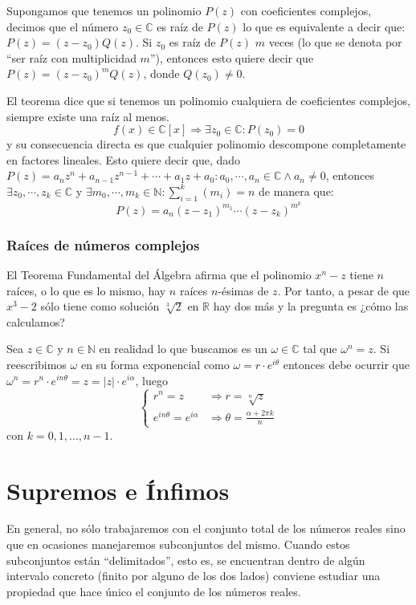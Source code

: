 \documentclass[10pt,a4paper,openright]{book}
\theoremstyle{break}
\begin{document}
Supongamos que tenemos un polinomio $P(z)$ con coeficientes complejos, decimos que el número $z_0\in \mathbb C$ es raíz de $P(z)$ lo que es equivalente a decir que: $P(z)=(z-z_0)Q(z)$. Si $z_0$ es raíz de $P(z)$ $m$ veces (lo que se denota por ``ser raíz con multiplicidad $m$''), entonces esto quiere decir que $P(z)=(z-z_0)^mQ(z)$, donde $Q(z_0)\neq 0$.

El teorema dice que si tenemos un polinomio cualquiera de coeficientes complejos, siempre existe una raíz al menos.
$$f(x)\in \mathbb C[x]\Rightarrow \exists z_0\in \mathbb C: P(z_0)=0$$
y su consecuencia directa es que cualquier polinomio descompone completamente en factores lineales. Esto quiere decir que, dado $P(z)=a_nz^n+a_{n-1}z^{n-1}+\cdots + a_1z+a_0: a_0,\cdots, a_n\in \mathbb C \wedge a_n\neq 0$, entonces $\exists z_0,\cdots, z_k\in \mathbb C$ y $\exists m_0,\cdots, m_k\in \mathbb N : \sum_{i=1}^k(m_i)=n$ de manera que:
$$P(z)=a_n(z-z_1)^{m_1}\cdots (z-z_k)^{m^k}$$

\subsubsection{Raíces de números complejos}
El Teorema Fundamental del Álgebra afirma que el polinomio $x^n - z$ tiene $n$ raíces, o lo que es lo mismo, hay $n$ raíces $n$-ésimas de $z$. Por tanto, a pesar de que $x^3-2$ sólo tiene como solución $\sqrt[3]{2}$ en $\mathbb R$ hay dos más y la pregunta es ¿cómo las calculamos?

Sea $z\in \mathbb C$ y $n\in \mathbb N$ en realidad lo que buscamos es un $\omega \in \mathbb C$ tal que $\omega^n=z$. Si reescribimos $\omega$ en su forma exponencial como $\omega=r\cdot e^{i\theta}$ entonces debe ocurrir que $\omega^n=r^n\cdot e^{in\theta}=z=|z|\cdot e^{i\alpha}$, luego 
\[
\begin{cases}
r^n=z & \Rightarrow r=\sqrt[n]{z} \\
e^{in\theta}=e^{i\alpha} & \Rightarrow \theta=\frac{\alpha+2\pi k}{n}
\end{cases}
\]
con $k=0,1,..., n-1$.

\section{Supremos e Ínfimos}
\label{sec: supremo e infimo}
En general, no sólo trabajaremos con el conjunto total de los números reales sino que en ocasiones manejaremos subconjuntos del mismo. Cuando estos subconjuntos están ``delimitados'', esto es, se encuentran dentro de algún intervalo concreto (finito por alguno de los dos lados) conviene estudiar una propiedad que hace único el conjunto de los números reales.
\end{document}
